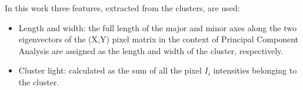 \documentclass[a4paper,11pt]{article}
\begin{document}
In this work three features, extracted from the clusters, are used: 
\begin{itemize}
    
    \item Length and width:
    the full length of the major and minor axes along the two eigenvectors of the (X,Y) pixel matrix in the context of Principal Component Analysis \cite{jolliffe2002springer} are assigned as the length and width of the cluster, respectively.
    

    
    \item Cluster light: calculated as the sum of all the pixel $I_i$ intensities belonging to the cluster.
\end{itemize}






\end{document}
